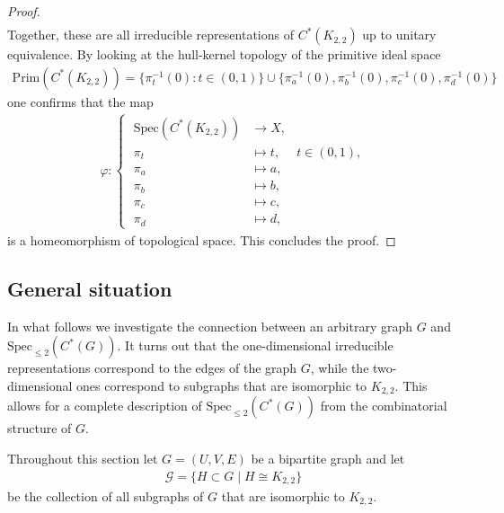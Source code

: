 \documentclass[a4paper]{amsart}
\begin{document}
\begin{proof}
\begin{align*}
    \end{align*}
    Together, these are all irreducible representations of $C^\ast(K_{2,2})$ up to unitary equivalence. By looking at the hull-kernel topology of the primitive ideal space
    \begin{align*}
        \mathrm{Prim}(C^\ast(K_{2,2})) = \{\pi_t^{-1}(0): t \in (0,1)\} \cup \{\pi_a^{-1}(0), \pi_b^{-1}(0), \pi_c^{-1}(0), \pi_d^{-1}(0)\}
    \end{align*}
    one confirms that the map
    \begin{align*}
        \varphi: \left\{ \; \begin{aligned}
            \mathrm{Spec}(C^\ast(K_{2,2})) &\to X, \\
            \pi_t &\mapsto t, &t \in (0,1), \\
            \pi_a & \mapsto a, \\
            \pi_b & \mapsto b, \\
            \pi_c & \mapsto c, \\
            \pi_d & \mapsto d,
        \end{aligned} \right.
    \end{align*}
    is a homeomorphism of topological space. This concludes the proof.
\end{proof}

\subsection{General situation}
\label{sec:one_two_dimensional_representations}

In what follows we investigate the connection between an arbitrary graph $G$ and $\mathrm{Spec}_{\leq 2}(C^\ast(G))$. It turns out that the one-dimensional irreducible representations correspond to the edges of the graph $G$, while the two-dimensional ones correspond to subgraphs that are isomorphic to $K_{2,2}$. This allows for a complete description of $\mathrm{Spec}_{\leq 2}(C^\ast(G))$ from the combinatorial structure of $G$.

Throughout this section let $G = (U, V, E)$ be a bipartite graph and let
\begin{align*}
    \mathcal{G} = \{H \subset G \mid H \cong K_{2,2}\}
\end{align*}
be the collection of all subgraphs of $G$ that are isomorphic to $K_{2,2}$.
\end{document}

